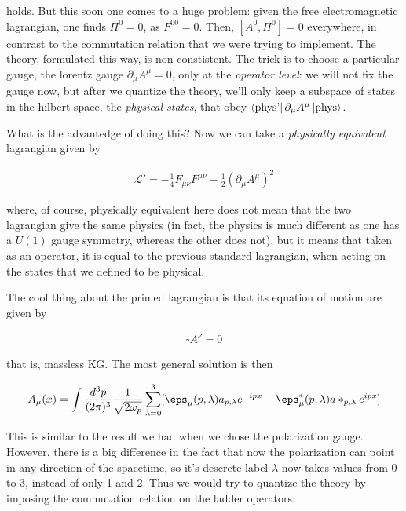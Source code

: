 \documentclass{report}
\begin{document}
holds. But this soon one comes to a huge problem: given the free electromagnetic lagrangian, one finds \(\Pi^0 = 0\), as \(F^{00} = 0\). Then, \([A^0, \Pi^0] = 0\) everywhere, in contrast to the commutation relation that we were trying to implement. The theory, formulated this way, is non constistent. The trick is to choose a particular gauge, the lorentz gauge \(\partial_\mu A^\mu = 0\), only at the \emph{operator level}: we will not fix the gauge now, but after we quantize the theory, we'll only keep a subspace of states in the hilbert space, the \emph{physical states}, that obey \(\bra{\text{phys'}} \partial_\mu A^\mu \ket{\text{phys}}\).   

What is the advantedge of doing this? Now we can take a \emph{physically equivalent} lagrangian given by 

\begin{align}
    \mathcal{L}' = -\frac{1}{4}F_{\mu\nu}F^{\mu\nu} - \frac{1}{2}(\partial_\mu A^\mu)^2
\end{align}

where, of course, physically equivalent here does not mean that the two lagrangian give the same physics (in fact, the physics is much different as one has a \(U(1)\) gauge symmetry, whereas the other does not), but it means that taken as an operator, it is equal to the previous standard lagrangian, when acting on the states that we defined to be physical.

The cool thing about the primed lagrangian is that its equation of motion are given by 

\begin{align}
    \square A^\nu = 0
\end{align}

that is, massless KG. The most general solution is then 

\begin{align}
    A_\mu(x) = \int \frac{d^3p}{(2\pi)^3}\frac{1}{\sqrt{2\omega_p}}\sum_{\lambda=0}^3[\eps_\mu(p, \lambda)a_{p, \lambda}e^{-ipx} + \eps^*_{\mu}(p, \lambda)a*_{p, \lambda}e^{ipx}]
\end{align}

This is similar to the result we had when we chose the polarization gauge. However, there is a big difference in the fact that now the polarization can point in any direction of the spacetime, so it's descrete label \(\lambda\) now takes values from 0 to 3, instead of only 1 and 2. Thus we would try to quantize the theory by imposing the commutation relation on the ladder operators: 
\end{document}

